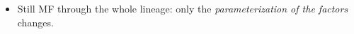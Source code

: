 \begin{itemize}
    \item Still MF through the whole lineage: only the \emph{parameterization of the factors} changes. 

\end{itemize}
